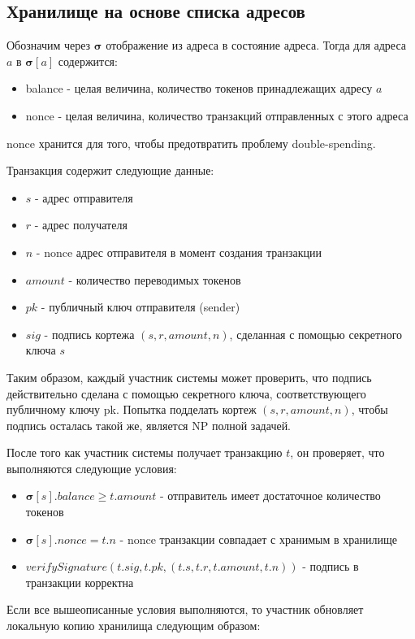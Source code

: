 \subsection{Хранилище на основе списка адресов}
Обозначим через $\boldsymbol{\sigma}$ отображение из адреса в состояние адреса. Тогда для адреса $a$ в $\boldsymbol{\sigma}[a]$ содержится:
\begin{itemize}
\item balance - целая величина, количество токенов принадлежащих адресу $a$
\item nonce  - целая величина, количество транзакций отправленных с этого адреса
\end{itemize}

nonce хранится для того, чтобы предотвратить проблему double-spending. 

\noindent Транзакция содержит следующие данные:
\begin{itemize}
\item $s$ - адрес отправителя
\item $r$ - адрес получателя
\item $n$ - nonce адрес отправителя в момент создания транзакции
\item $amount$ - количество переводимых токенов
\item $pk$ - публичный ключ отправителя (sender)
\item $sig$ - подпись кортежа $(s, r, amount, n)$, сделанная с помощью секретного ключа $s$
\end{itemize}

\noindent Таким образом, каждый участник системы может проверить, что подпись действительно сделана с помощью секретного ключа, соответствующего публичному ключу pk. Попытка подделать кортеж $(s, r, amount, n)$, чтобы подпись осталась такой же, является NP полной задачей.

После того как участник системы получает транзакцию $t$, он проверяет, что выполняются следующие условия:
\begin{itemize}
\item $\boldsymbol{\sigma}[s].balance \ge t.amount$ - отправитель имеет достаточное количество токенов
\item $\boldsymbol{\sigma}[s].nonce = t.n$ - nonce транзакции совпадает с хранимым в хранилище
\item $verifySignature(t.sig, t.pk, (t.s, t.r, t.amount, t.n))$ - подпись в транзакции корректна
\end{itemize}

Если все вышеописанные условия выполняются, то участник обновляет локальную копию хранилища следующим образом:

